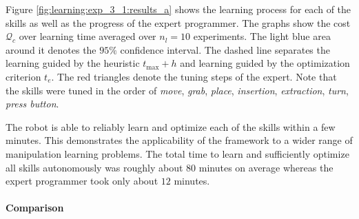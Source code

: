 Figure \ref{fig:learning:exp_3_1:results_a} shows the learning process for each of the skills as well as the progress of the expert programmer.
The graphs show the cost $\mathcal{Q}_c$ over learning time averaged over $n_l=10$ experiments.
The light blue area around it denotes the $95 \%$ confidence interval.
The dashed line separates the learning guided by the heuristic $t_\text{max} + h$ and learning guided by the optimization criterion $t_e$.
The red triangles denote the tuning steps of the expert.
Note that the skills were tuned in the order of \textit{move}, \textit{grab}, \textit{place}, \textit{insertion}, \textit{extraction}, \textit{turn}, \textit{press button}.

The robot is able to reliably learn and optimize each of the skills within a few minutes.
This demonstrates the applicability of the \skillmodelabbr{} framework to a wider range of manipulation learning problems.
The total time to learn and sufficiently optimize all skills autonomously was roughly about $80$ minutes on average whereas the expert programmer took only about $12$ minutes.

\paragraph{Comparison}

